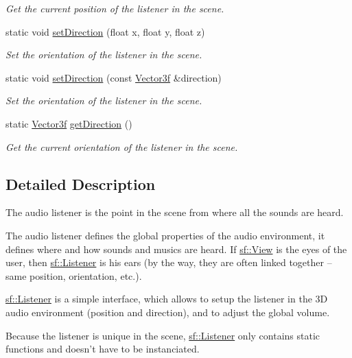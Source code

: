 \begin{DoxyCompactItemize}
\begin{DoxyCompactList}\small\item\em Get the current position of the listener in the scene. \end{DoxyCompactList}\item 
static void \hyperlink{classsf_1_1_listener_ae479dc15513c6557984d26e32d06d06e}{set\+Direction} (float x, float y, float z)
\begin{DoxyCompactList}\small\item\em Set the orientation of the listener in the scene. \end{DoxyCompactList}\item 
static void \hyperlink{classsf_1_1_listener_a1d99d9457c6ddad93449ecb4f504c2bf}{set\+Direction} (const \hyperlink{classsf_1_1_vector3}{Vector3f} \&direction)
\begin{DoxyCompactList}\small\item\em Set the orientation of the listener in the scene. \end{DoxyCompactList}\item 
static \hyperlink{classsf_1_1_vector3}{Vector3f} \hyperlink{classsf_1_1_listener_a54e91baba51d4431474f53ff7f9309f9}{get\+Direction} ()
\begin{DoxyCompactList}\small\item\em Get the current orientation of the listener in the scene. \end{DoxyCompactList}\end{DoxyCompactItemize}


\subsection{Detailed Description}
The audio listener is the point in the scene from where all the sounds are heard. 

The audio listener defines the global properties of the audio environment, it defines where and how sounds and musics are heard. If \hyperlink{classsf_1_1_view}{sf\+::\+View} is the eyes of the user, then \hyperlink{classsf_1_1_listener}{sf\+::\+Listener} is his ears (by the way, they are often linked together -- same position, orientation, etc.).

\hyperlink{classsf_1_1_listener}{sf\+::\+Listener} is a simple interface, which allows to setup the listener in the 3\+D audio environment (position and direction), and to adjust the global volume.

Because the listener is unique in the scene, \hyperlink{classsf_1_1_listener}{sf\+::\+Listener} only contains static functions and doesn't have to be instanciated.

